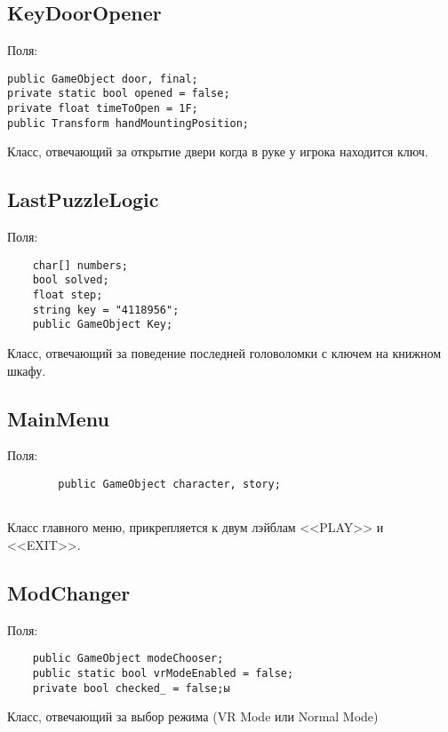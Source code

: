 \subsection{KeyDoorOpener}
Поля:\\
\begin{small}
    \begin{verbatim}
public GameObject door, final;
private static bool opened = false;
private float timeToOpen = 1F;
public Transform handMountingPosition;
    \end{verbatim}
\end{small}

Класс, отвечающий за открытие двери когда в руке у игрока находится ключ.

\subsection{LastPuzzleLogic}
Поля:\\
\begin{small}
    \begin{verbatim}
    char[] numbers;
    bool solved;
    float step;
    string key = "4118956";
    public GameObject Key;
        \end{verbatim}
\end{small}

Класс, отвечающий за поведение последней головоломки с ключем на книжном шкафу.

\subsection{MainMenu}
 Поля:\\
\begin{small}
    \begin{verbatim}
        public GameObject character, story;
   
    \end{verbatim}
\end{small}

Класс главного меню, прикрепляется к двум лэйблам <<PLAY>> и <<EXIT>>.

\subsection{ModChanger}
Поля:\\
\begin{small}
    \begin{verbatim}
    public GameObject modeChooser;
    public static bool vrModeEnabled = false;
    private bool checked_ = false;ы
    \end{verbatim}
\end{small}
Класс, отвечающий за выбор режима (VR Mode или Normal Mode)


